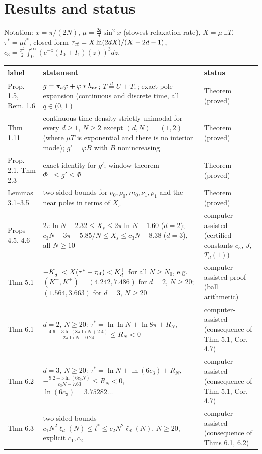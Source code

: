 \documentclass[11pt,a4paper]{article}
\theoremstyle{definition}
\theoremstyle{remark}
\begin{document}
\setcounter{section}{-1}
\section{Results and status}

Notation: $x=\pi/(2N)$, $\mu=\frac{2q}{d}\sin^2x$ (slowest relaxation rate), $X=\mu\,\mathbb E T$, $\tau^*=\mu t^*$, closed form $\tau_{\rm cf}=X\ln(2dX)/(X+2d-1)$, $c_3=\frac{\pi^2}{2}\int_0^\infty(e^{-z}(I_0+I_1)(z))^3dz$.

{\small
\begin{longtable}{>{\raggedright\arraybackslash}p{2.7cm}>{\raggedright\arraybackslash}p{8.9cm}>{\raggedright\arraybackslash}p{3.6cm}}
\toprule
label & statement & status \\ \midrule
\endhead
Prop. 1.5, Rem. 1.6 & $g=\pi_a\varphi+\varphi*h_{\rm ac}$; $T\overset d=U+T_\pi$; exact pole expansion (continuous and discrete time, all $q\in(0,1]$) & Theorem (proved) \\
Thm 1.11 & continuous-time density strictly unimodal for every $d\ge1$, $N\ge2$ except $(d,N)=(1,2)$ (where $\mu T$ is exponential and there is no interior mode); $g'=\varphi B$ with $B$ nonincreasing & Theorem (proved) \\
Prop. 2.1, Thm 2.3 & exact identity for $g'$; window theorem $\Phi_-\le g'\le\Phi_+$ & Theorem (proved) \\
Lemmas 3.1–3.5 & two-sided bounds for $\nu_0,\rho_0,m_0,\nu_1,\rho_1$ and the near poles in terms of $X_s$ & Theorem (proved) \\
Props 4.5, 4.6 & $2\pi\ln N-2.32\le X_s\le2\pi\ln N-1.60$ ($d=2$); $c_3N-3\pi-5.85/N\le X_s\le c_3N-8.38$ ($d=3$), all $N\ge10$ & computer-assisted (certified constants $c_\kappa$, $J$, $T_d(1)$) \\
Thm 5.1 & $-K^-_d<X(\tau^*-\tau_{\rm cf})<K^+_d$ for all $N\ge N_0$, e.g. $(K^-,K^+)=(4.242,7.486)$ for $d=2$, $N\ge20$; $(1.564,3.663)$ for $d=3$, $N\ge20$ & computer-assisted proof (ball arithmetic) \\
Thm 6.1 & $d=2$, $N\ge20$: $\tau^*=\ln\ln N+\ln8\pi+R_N$, $-\frac{4.6+3\ln(8\pi\ln N+2.4)}{2\pi\ln N-0.24}\le R_N<0$ & computer-assisted (consequence of Thm 5.1, Cor. 4.7) \\
Thm 6.2 & $d=3$, $N\ge20$: $\tau^*=\ln N+\ln(6c_3)+R_N$, $-\frac{9.2+5\ln(6c_3N)}{c_3N-7.63}\le R_N<0$, $\ln(6c_3)=3.75282\ldots$ & computer-assisted (consequence of Thm 5.1, Cor. 4.7) \\
Thm 6.3 & two-sided bounds $c_1N^2\ell_d(N)\le t^*\le c_2N^2\ell_d(N)$, $N\ge20$, explicit $c_1,c_2$ & computer-assisted (consequence of Thms 6.1, 6.2) \\

\end{longtable}}
\end{document}

